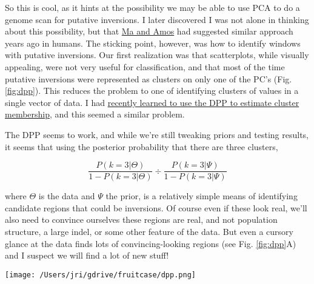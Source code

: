 \documentclass[]{article}
\begin{document}
So this is cool, as it hints at the possibility we may be able to use PCA to do a genome scan for putative inversions. 
I later discovered I was not alone in thinking about this possibility, but that \href{http://journals.plos.org/plosone/article?id=10.1371/journal.pone.0040224}{Ma and Amos} had suggested similar approach years ago in humans.  
The sticking point, however, was how to identify windows with putative inversions.  
Our first realization was that  scatterplots, while visually appealing,  were not very useful for classification, and that most of the time putative inversions were represented as clusters on only one of the PC's (Fig. \ref{fig:dpp}).  
This reduces the problem to one of identifying clusters of values in a single vector of data. I had \href{}{recently learned to use the DPP to estimate cluster membership}, and this seemed a similar problem. 

The DPP seems to work, and while we're still tweaking priors and testing results, it seems that using the posterior probability that there are three clusters,

\begin{equation}
\frac{P(k=3|\Theta)}{1-P(k=3|\Theta)}\div \frac{P(k=3|\Psi)}{1-P(k=3|\Psi)}
\end{equation}

where $\Theta$ is the data and $\Psi$ the prior, is a relatively simple means of identifying candidate regions that could be inversions.  
Of course even if these look real, we'll also need to convince ourselves these regions are real, and not population structure, a large indel, or some other feature of the data. 
But even a cursory glance at the data finds lots of convincing-looking regions (see Fig. \ref{fig:dpp}A) and I suspect we will find a lot of new stuff!

\begin{figure*}[h]   
  \begin{center}
   \texttt{[image: /Users/jri/gdrive/fruitcase/dpp.png]}
   \caption{
   Histogram of scaled [0,1] eigenvalues along an individual principal component for a particular region on chromosome 10 in the SeeDs data. The region shown in (A) appears to be consistent with an inversion polymorphism forming 3 clusteres representing the 3 genotypes at the inversion, while (B) appears a normal region of the genome lacking any evidence of an inversion.} 
    \label{fig:dpp}
  \end{center}
\end{figure*}
\end{document}
